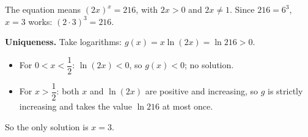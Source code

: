 The equation means $(2x)^x=216$, with $2x>0$ and $2x\ne1$. Since $216=6^3$, $x=3$ works: $(2\cdot3)^3=216$.

\textbf{Uniqueness.} Take logarithms: $g(x)=x\ln(2x)=\ln216>0$.
\begin{itemize}
\item For $0<x<\dfrac{1}{2}$: $\ln(2x)<0$, so $g(x)<0$; no solution.
\item For $x>\dfrac{1}{2}$: both $x$ and $\ln(2x)$ are positive and increasing, so $g$ is strictly increasing and takes the value $\ln216$ at most once.
\end{itemize}
So the only solution is $\boxed{x=3}$.
